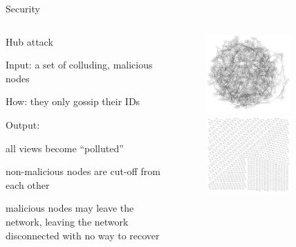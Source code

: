 \begin{frame}{Security}

\begin{columns}
\begin{column}{0.55\textwidth}
\begin{block}{Hub attack}
\BIL
\item Input: a set of colluding, malicious nodes 
\item How: they only gossip their IDs
\item Output: 
\BI
\item all views become “polluted”
\item non-malicious nodes are cut-off from each other
\item malicious nodes may leave the network, leaving the network disconnected with no way to recover
\EI
\EIL
\end{block}
\end{column}
\begin{column}{0.45\textwidth}
\begin{figure}
\includegraphics[width=0.7\textwidth]{figs/11/hub1}\\
\includegraphics[width=0.7\textwidth]{figs/11/hub2}	
\end{figure}
\end{column}
\end{columns}

\end{frame}

